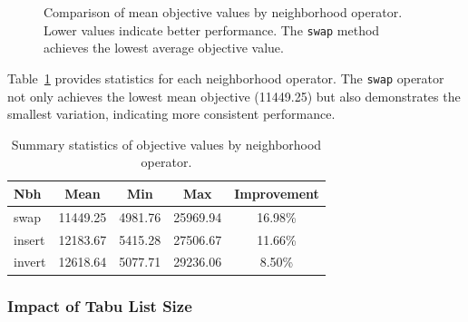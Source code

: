 \begin{figure}[ht]
    \centering
    \caption{Comparison of mean objective values by neighborhood operator. Lower values indicate better performance. The \texttt{swap} method achieves the lowest average objective value.}
    \label{fig:mutation_comparison}
\end{figure}

Table~\ref{tab:mutation_summary} provides statistics for each neighborhood operator. The \texttt{swap} operator not only achieves the lowest mean objective (11449.25) but also demonstrates the smallest variation, indicating more consistent performance.

\begin{table}[ht]
    \renewcommand{\arraystretch}{1.3}
    \caption{Summary statistics of objective values by neighborhood operator.}
    \label{tab:mutation_summary}
    \centering
    \begin{tabular}{l|c|c|c|c}
        \hline\hline
        Nbh & Mean & Min & Max & Improvement \\
        \hline\hline
        swap   & 11449.25 & 4981.76 & 25969.94 & 16.98\% \\ \hline
        insert & 12183.67 & 5415.28 & 27506.67 & 11.66\% \\ \hline
        invert & 12618.64 & 5077.71 & 29236.06 &  8.50\% \\
        \hline\hline
    \end{tabular}
\end{table}

\subsubsection{Impact of Tabu List Size}

